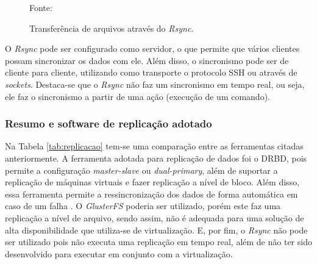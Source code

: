 \begin{figure}[h!]
 \centering
 \caption{Transferência de arquivos através do \textit{Rsync}.}
 Fonte: \citet{lopez2012}
 \label{fig:rsync}
\end{figure}


O \textit{Rsync} pode ser configurado como servidor, o que permite que vários clientes possam sincronizar os dados com ele. 
Além disso, o sincronismo pode ser de cliente para cliente, utilizando como transporte o protocolo \ac{SSH} ou através de \textit{sockets}.
Destaca-se que o \textit{Rsync} não faz um sincronismo em tempo real, ou seja, ele faz o sincronismo a partir de uma ação (execução de um comando).


\subsubsection{Resumo e software de replicação adotado}
\label{section:replicacaoescolhido}

Na Tabela \ref{tab:replicacao} tem-se uma comparação entre as ferramentas citadas anteriormente. 
A ferramenta adotada para replicação de dados foi o \ac{DRBD}, pois permite a configuração \textit{master-slave} ou \textit{dual-primary}, 
além de suportar a replicação de máquinas virtuais e fazer replicação a nível de bloco. Além disso, essa ferramenta permite a ressincronização 
dos dados de forma automática em caso de um falha \cite{drbd}.
O \textit{GlusterFS} poderia ser utilizado, porém este faz uma replicação a nível de arquivo, sendo assim, não é adequada para uma 
solução de alta disponibilidade que utiliza-se de virtualização. 
E, por fim, o \textit{Rsync} não pode ser utilizado pois não executa uma replicação em tempo real, além de não ter sido desenvolvido para
executar em conjunto com a virtualização.


